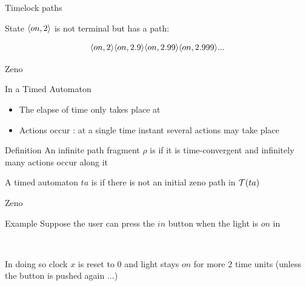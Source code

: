 \documentclass[aspectratio=169]{beamer}
\begin{document}
\begin{slide}{Timelock paths}
\small


\begin{center}
\end{center}

State $\langle on,2 \rangle$ \pause is not terminal but has a  path:

$$\langle on,2 \rangle \langle on,2.9 \rangle  \langle on,2.99 \rangle  \langle on,2.999 \rangle  ...$$

\end{slide}



\begin{slide}{Zeno}
\small

\begin{block}{In a Timed Automaton}
\begin{itemize}
\item The elapse of time only takes place at 
\item Actions occur : at a single time instant several actions may take place
\end{itemize}

\end{block}

\pause
\begin{block}{Definition}
An infinite path fragment $\rho$ is  if it is \alert{time-convergent} and
\alert{infinitely many actions occur along it}



A timed automaton $ta$ is  if there is not an initial zeno path in $\mathcal{T}(ta)$
\end{block}

\end{slide}


\begin{slide}{Zeno}
\small


\begin{block}{Example}
Suppose the user can press the $in$ button when the light is $on$ in
\begin{figure}[htb]
  \centering
  \\
\end{figure}
In doing so clock $x$ is reset to 0 and light stays $on$ for more 2 time units (unless the button is pushed again ...)
\end{block}

\end{slide}
\end{document}
